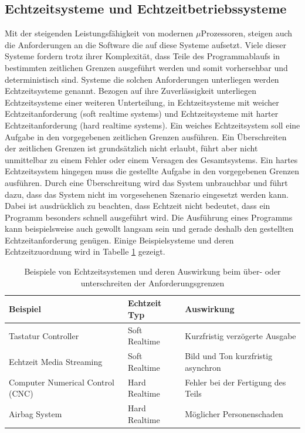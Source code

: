 

\subsection{Echtzeitsysteme und Echtzeitbetriebssysteme}
\label{sec:Echtzeitsysteme}
Mit der steigenden Leis\-tungs\-fähig\-keit von modernen $\mu$\-Pro\-zesso\-ren, steigen auch die Anforderungen an die Software die auf diese Systeme aufsetzt. Viele dieser Systeme fordern trotz ihrer Komplexität, dass Teile des Pro\-gramm\-ab\-laufs in bestimmten zeitlichen Grenzen ausgeführt werden und somit vorhersehbar und deterministisch sind. Systeme die solchen Anforderungen unterliegen werden Echtzeitsysteme genannt. Bezogen auf ihre Zuverlässigkeit unterliegen Echtzeitsysteme einer weiteren Unterteilung, in Echtzeitsysteme mit weicher Echtzeitanforderung (soft realtime systems) und Echtzeitsysteme mit harter Echtzeitanforderung (hard realtime systems). Ein weiches Echtzeitsystem soll eine Aufgabe in den vorgegebenen zeitlichen Grenzen ausführen. Ein Über\-schreiten der zeitlichen Grenzen ist grundsätzlich nicht erlaubt, führt aber nicht unmittelbar zu einem Fehler oder einem Versagen des Gesamtsystems. Ein hartes Echtzeitsystem hingegen muss die gestellte Aufgabe in den vorgegebenen Grenzen aus\-füh\-ren. Durch eine Überschreitung wird das System unbrauchbar und führt dazu, dass das System nicht im vorgesehenen Szenario eingesetzt werden kann. Dabei ist ausdrücklich zu beachten, dass Echtzeit nicht bedeutet, dass ein Programm besonders schnell ausgeführt wird. Die Ausführung eines Programms kann beispielsweise auch gewollt langsam sein und gerade deshalb den gestellten Echtzeitanforderung genügen. Einige Beispielsysteme und deren Echtzeitzuordnung wird in Tabelle \ref{tab:BeispieleEchtzeitsystem} gezeigt. 
\begin{table}
\centering
	\begin{tabular}{|l|l|l|}
		\hline
		\textbf{Beispiel} & \textbf{Echtzeit Typ}  & \textbf{Auswirkung} \\
		\hline
		Tastatur Controller & Soft Realtime & Kurzfristig verzögerte Ausgabe \\
		\hline
		Echtzeit Media Streaming  & Soft Realtime & Bild und Ton kurzfristig asynchron \\
		\hline
		Computer Numerical Control (CNC)  & Hard Realtime & Fehler bei der Fertigung des Teils\\
		\hline
		Airbag System  & Hard Realtime & Möglicher Personenschaden\\
		\hline
	\end{tabular}
	\caption{Beispiele von Echtzeitsystemen und deren Auswirkung beim über- oder unterschreiten der Anforderungsgrenzen}
	\label{tab:BeispieleEchtzeitsystem}
\end{table}
